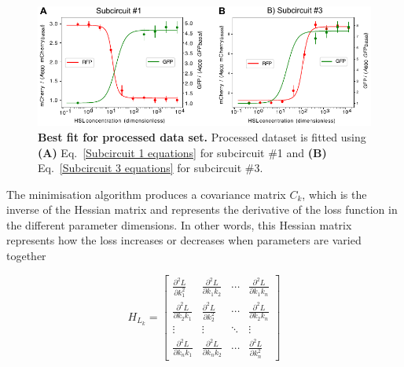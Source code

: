 \begin{figure}[H] %
    \centering
    \begin{adjustbox}{center}
        \includegraphics[width=1\textwidth]{chapters/Chapter 2/dose_responses_bestfit} %
    \end{adjustbox}
    \caption{\textbf{Best fit for processed data set.} Processed dataset is fitted using \textbf{(A)} Eq.~\ref{Subcircuit 1 equations} for subcircuit \#1 and \textbf{(B)} Eq.~\ref{Subcircuit 3 equations} for subcircuit \#3.}

    \label{fig:dose_responses_bestfit} %
\end{figure}


The minimisation algorithm produces a covariance matrix $C_k$,
which is the inverse of the Hessian matrix
and represents the derivative of the loss function in the different parameter dimensions.
In other words, this Hessian matrix represents how the loss increases or decreases when parameters are varied together

\begin{equation}
    H_{L_{k}} = \begin{bmatrix}
                     \frac{\partial^2 L}{\partial k_1^2} & \frac{\partial^2 L}{\partial k_1 k_2} & \cdots & \frac{\partial^2 L}{\partial k_1 k_{n}} \\
                     \frac{\partial^2 L}{\partial k_2 k_1} & \frac{\partial^2 L}{\partial k_2^2} & \cdots & \frac{\partial^2 L}{\partial k_2  k_{n}} \\
                     \vdots & \vdots & \ddots & \vdots \\
                     \frac{\partial^2 L}{\partial k_{n}k_1} & \frac{\partial^2 L}{\partial k_{n}  k_2} & \cdots & \frac{\partial^2 L}{\partial k_{n}^2}
    \end{bmatrix}
\end{equation}



